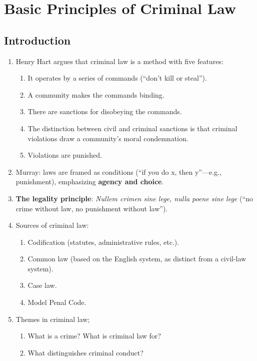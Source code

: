 \section{Basic Principles of Criminal Law}

\subsection{Introduction}

\begin{enumerate}
    \item Henry Hart argues that criminal law is a method with five features:
    \begin{enumerate}
        \item It operates by a series of commands (``don't kill or steal'').
        \item A community makes the commands binding.
        \item There are sanctions for disobeying the commands.
        \item The distinction between civil and criminal sanctions is that 
        criminal violations draw a community's moral condemnation.
        \item Violations are punished.
    \end{enumerate}
    \item Murray: laws are framed as conditions (``if you do x, then 
    y''---e.g., punishment), emphasizing \textbf{agency and choice}.
    \item \textbf{The legality principle}: \emph{Nullem crimen sine lege, 
    nulla poene sine lege} (``no crime 
    without law, no punishment without law'').
    \item Sources of criminal law:
    \begin{enumerate}
        \item Codification (statutes, administrative rules, etc.).
        \item Common law (based on the English system, as distinct from a 
        civil-law system).
        \item Case law.
        \item Model Penal Code.
    \end{enumerate}
    \item Themes in criminal law;
    \begin{enumerate}
        \item What is a crime? What is criminal law for?
        \item What distinguishes criminal conduct?

\end{enumerate}
\end{enumerate}
